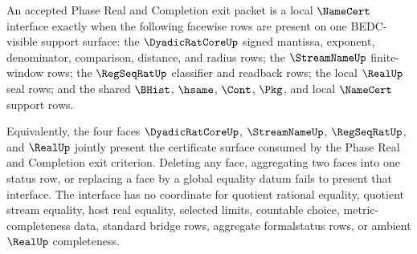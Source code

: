 \begin{theorem}
\label{thm:dyadicratcore-l10-exit-namecert-interface}
An accepted Phase Real and Completion exit packet is a local $\NameCert$ interface exactly when the following facewise rows are present on one BEDC-visible support surface: the $\DyadicRatCoreUp$ signed mantissa, exponent, denominator, comparison, distance, and radius rows; the $\StreamNameUp$ finite-window rows; the $\RegSeqRatUp$ classifier and readback rows; the local $\RealUp$ seal rows; and the shared $\BHist$, $\hsame$, $\Cont$, $\Pkg$, and local $\NameCert$ support rows.

Equivalently, the four faces $\DyadicRatCoreUp$, $\StreamNameUp$, $\RegSeqRatUp$, and $\RealUp$ jointly present the certificate surface consumed by the Phase Real and Completion exit criterion. Deleting any face, aggregating two faces into one status row, or replacing a face by a global equality datum fails to present that interface. The interface has no coordinate for quotient rational equality, quotient stream equality, host real equality, selected limits, countable choice, metric-completeness data, standard bridge rows, aggregate formalstatus rows, or ambient $\RealUp$ completeness.
\end{theorem}
